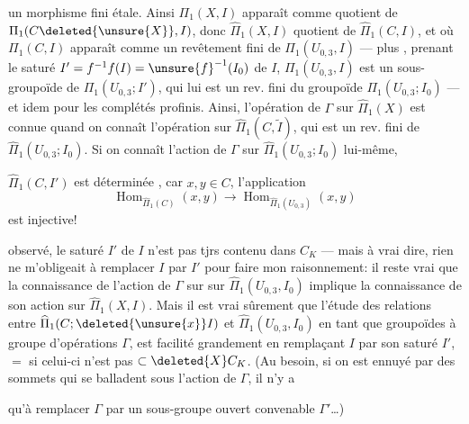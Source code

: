 un morphisme fini étale. Ainsi $\Pi_1(X,I)$ apparaît comme quotient de $\Pi_1(C\deleted{\unsure{X}},I)$, donc $\widehat\Pi_1(X,I)$ quotient de $\widehat\Pi_1(C,I)$, et où $\Pi_1(C,I)$ apparaît comme un revêtement fini de $\Pi_1(U_{0,3},I)$ --- plus  , prenant le saturé $I'=f^{-1}f(I)=\unsure{f}^{-1}(I_0)$ de $I$, $\Pi_1(U_{0,3},I)$ est un sous-groupoïde  de $\Pi_1(U_{0,3};I')$, qui lui est un rev. fini du groupoïde $\Pi_1(U_{0,3};I_0)$ --- et idem pour les complétés profinis. Ainsi, l'opération de $\Gamma$ sur $\widehat\Pi_1(X)$ est connue quand on connaît l'opération sur $\widehat\Pi_1(C,\widetilde I)$, qui est un rev. fini de $\widehat\Pi_1(U_{0,3};I_0)$. Si on connaît l'action de $\Gamma$ sur $\widehat\Pi_1(U_{0,3};I_0)$ lui-même, 

$\widehat\Pi_1(C,I')$ est déterminée , car  $x,y\in C$, l'application
\[
\operatorname{Hom}_{\widehat\Pi_1(C)}(x,y)\longrightarrow\operatorname{Hom}_{\widehat\Pi_1(U_{0,3})}(x,y)
\]
est injective!

  observé,  le saturé $I'$ de $I$  n'est pas tjrs  contenu dans  $C_K$ --- mais à vrai dire, rien ne m'obligeait à remplacer $I$ par $I'$ pour faire mon raisonnement: il reste vrai que la connaissance de l'action de $\Gamma$ sur sur $\widehat\Pi_1(U_{0,3},I_0)$ implique la connaissance de son action sur $\widehat\Pi_1(X,I)$. Mais il est vrai sûrement que l'étude des relations entre $\widehat\Pi_1(C;\deleted{\unsure{x}}I)$ et $\widehat\Pi_1(U_{0,3},I_0)$ en tant que groupoïdes à groupe d'opérations $\Gamma$, est facilité grandement en remplaçant $I$ par son saturé $I'$, $=$ si celui-ci n'est pas $\subset\deleted{X}C_K$. (Au besoin, si on est ennuyé par des sommets qui se balladent sous l'action de $\Gamma$, il n'y a

qu'à remplacer $\Gamma$ par un sous-groupe ouvert convenable $\Gamma'$\ldots)

